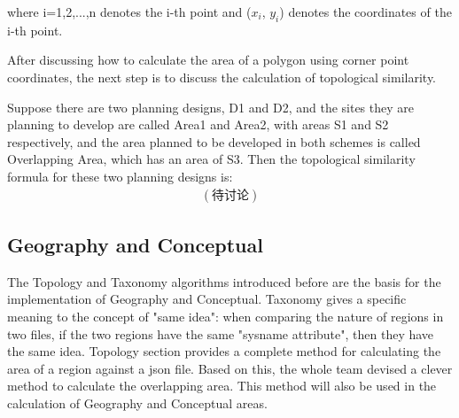 where i=1,2,...,n denotes the i-th point and ($x_{i}$, $y_{i}$) denotes the coordinates of the i-th point.

After discussing how to calculate the area of a polygon using corner point coordinates, the next step is to discuss the calculation of topological similarity.

Suppose there are two planning designs, D1 and D2, and the sites they are planning to develop are called Area1 and Area2, with areas S1 and S2 respectively, and the area planned to be developed in both schemes is called Overlapping Area, which has an area of S3.
Then the topological similarity formula for these two planning designs is:
\begin{equation}
\begin{split}
(待讨论)
\end{split}
\end{equation}

\subsection*{Geography and Conceptual}
The Topology and Taxonomy algorithms introduced before are the basis for the implementation of Geography and Conceptual. Taxonomy gives a specific meaning to the concept of "same idea": when comparing the nature of regions in two files, if the two regions have the same "sysname attribute", then they have the same idea. Topology section provides a complete method for calculating the area of a region against a json file. Based on this, the whole team devised a clever method to calculate the overlapping area. This method will also be used in the calculation of Geography and Conceptual areas.

